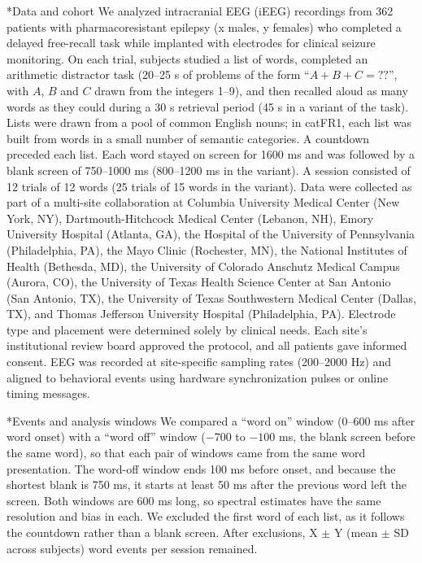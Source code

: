 \documentclass[10pt,twocolumn]{article}  %
\makeatletter
\renewcommand\subsection{\@startsection{subsection}{2}{\z@}{-8pt plus -2pt minus -1pt}{2pt}{\raggedright\sffamily\bfseries\normalsize}}
\makeatother
\begin{document}
\subsection*{Data and cohort}\label{data-and-cohort}
We analyzed intracranial EEG (iEEG) recordings from 362 patients with pharmacoresistant epilepsy (x males, y females) who completed a delayed free-recall task while implanted with electrodes for clinical seizure monitoring. On each trial, subjects studied a list of words, completed an arithmetic distractor task (20--25 s of problems of the form ``$A + B + C = ??$'', with $A$, $B$ and $C$ drawn from the integers 1--9), and then recalled aloud as many words as they could during a 30 s retrieval period (45 s in a variant of the task). Lists were drawn from a pool of common English nouns; in catFR1, each list was built from words in a small number of semantic categories. A countdown preceded each list. Each word stayed on screen for 1600 ms and was followed by a blank screen of 750--1000 ms (800--1200 ms in the variant). A session consisted of 12 trials of 12 words (25 trials of 15 words in the variant). Data were collected as part of a multi-site collaboration at Columbia University Medical Center (New York, NY), Dartmouth-Hitchcock Medical Center (Lebanon, NH), Emory University Hospital (Atlanta, GA), the Hospital of the University of Pennsylvania (Philadelphia, PA), the Mayo Clinic (Rochester, MN), the National Institutes of Health (Bethesda, MD), the University of Colorado Anschutz Medical Campus (Aurora, CO), the University of Texas Health Science Center at San Antonio (San Antonio, TX), the University of Texas Southwestern Medical Center (Dallas, TX), and Thomas Jefferson University Hospital (Philadelphia, PA). Electrode type and placement were determined solely by clinical needs. Each site's institutional review board approved the protocol, and all patients gave informed consent. EEG was recorded at site-specific sampling rates (200--2000 Hz) and aligned to behavioral events using hardware synchronization pulses or online timing messages.

\subsection*{Events and analysis windows}\label{events}
We compared a ``word on'' window (0--600 ms after word onset) with a ``word off'' window ($-700$ to $-100$ ms, the blank screen before the same word), so that each pair of windows came from the same word presentation. The word-off window ends 100 ms before onset, and because the shortest blank is 750 ms, it starts at least 50 ms after the previous word left the screen. Both windows are 600 ms long, so spectral estimates have the same resolution and bias in each. We excluded the first word of each list, as it follows the countdown rather than a blank screen. After exclusions, X $\pm$ Y (mean $\pm$ SD across subjects) word events per session remained.
\end{document}
